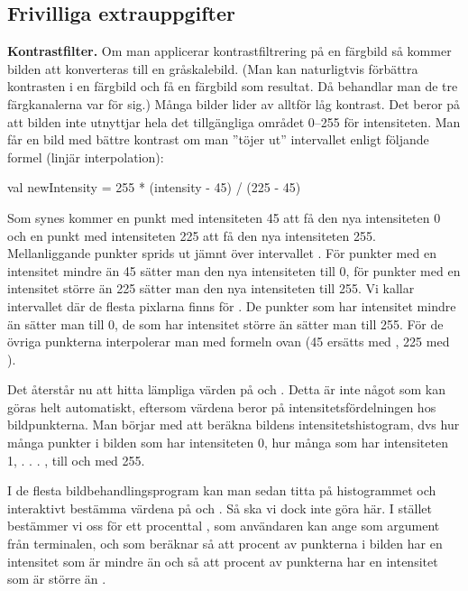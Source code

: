 \subsection{Frivilliga extrauppgifter}

\Task \textbf{Kontrastfilter.} Om man applicerar kontrastfiltrering på en färgbild så kommer bilden att konverteras till en gråskalebild. (Man kan naturligtvis förbättra kontrasten i en färgbild och få en färgbild som resultat. Då behandlar man de tre färgkanalerna var för sig.) Många bilder lider av alltför låg kontrast. Det beror på att bilden inte utnyttjar hela det tillgängliga området 0–255 för intensiteten. Man får en bild med bättre kontrast om man ''töjer ut'' intervallet enligt följande formel (linjär interpolation):

\begin{Code}
val newIntensity = 255 * (intensity - 45) / (225 - 45)
\end{Code}

Som synes kommer en punkt med intensiteten 45 att få den nya intensiteten 0 och en punkt med intensiteten 225 att få den nya intensiteten 255. Mellanliggande punkter sprids ut jämnt över intervallet \code{[0, 255]}. För punkter med en intensitet mindre än 45 sätter man den nya intensiteten till 0, för punkter med en intensitet större än 225 sätter man den nya intensiteten till 255. Vi kallar intervallet där de flesta pixlarna finns för . De punkter som har intensitet mindre än  sätter man till 0, de som har intensitet större än  sätter man till 255. För de övriga punkterna interpolerar man med formeln ovan (45 ersätts med , 225 med ).

Det återstår nu att hitta lämpliga värden på  och . Detta är inte något som kan göras helt automatiskt, eftersom värdena beror på intensitetsfördelningen hos bildpunkterna. Man börjar med att beräkna bildens intensitetshistogram, dvs hur många punkter i bilden som har intensiteten 0, hur många som har intensiteten 1, . . . , till och med 255.

I de flesta bildbehandlingsprogram kan man sedan titta på histogrammet och interaktivt bestämma värdena på  och . Så ska vi dock inte göra här. I stället bestämmer vi oss för ett procenttal , som användaren kan ange som argument från terminalen, och som  beräknar  så att  procent av punkterna i bilden har en intensitet som är mindre än  och  så att  procent av punkterna har en intensitet som är större än .

